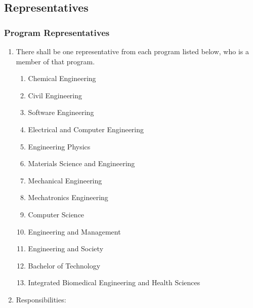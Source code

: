 \subsection{Representatives}
\label{representatives}
\subsubsection{Program
 Representatives}
\label{program-representatives}

\begin{enumerate}
\item
 There shall be one representative from each program listed below, who
 is a member of that program.

 \begin{enumerate}
  \item
   Chemical Engineering
  \item
   Civil Engineering
  \item
   Software Engineering
  \item
   Electrical and Computer Engineering
  \item
   Engineering Physics
  \item
   Materials Science and Engineering
  \item
   Mechanical Engineering
  \item
   Mechatronics Engineering
  \item
   Computer Science
  \item
   Engineering and Management
  \item
   Engineering and Society
  \item
   Bachelor of Technology
  \item
   Integrated Biomedical Engineering and Health Sciences
 \end{enumerate}

\item
 Responsibilities:


\end{enumerate}
